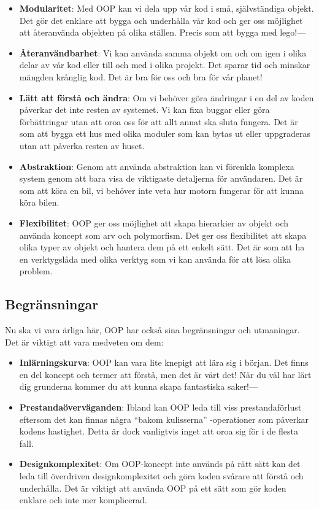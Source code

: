 \begin{itemize}
\tightlist
\item
  \textbf{Modularitet}: Med OOP kan vi dela upp vår kod i små,
  självständiga objekt. Det gör det enklare att bygga och underhålla vår
  kod och ger oss möjlighet att återanvända objekten på olika ställen.
  Precis som att bygga med lego!---
\item
  \textbf{Återanvändbarhet}: Vi kan använda samma objekt om och om igen
  i olika delar av vår kod eller till och med i olika projekt. Det
  sparar tid och minskar mängden krånglig kod. Det är bra för oss och
  bra för vår planet!
\item
  \textbf{Lätt att förstå och ändra}: Om vi behöver göra ändringar i en
  del av koden påverkar det inte resten av systemet. Vi kan fixa buggar
  eller göra förbättringar utan att oroa oss för att allt annat ska
  sluta fungera. Det är som att bygga ett hus med olika moduler som kan
  bytas ut eller uppgraderas utan att påverka resten av huset.
\item
  \textbf{Abstraktion}: Genom att använda abstraktion kan vi förenkla
  komplexa system genom att bara visa de viktigaste detaljerna för
  användaren. Det är som att köra en bil, vi behöver inte veta hur
  motorn fungerar för att kunna köra bilen.
\item
  \textbf{Flexibilitet}: OOP ger oss möjlighet att skapa hierarkier av
  objekt och använda koncept som arv och polymorfism. Det ger oss
  flexibilitet att skapa olika typer av objekt och hantera dem på ett
  enkelt sätt. Det är som att ha en verktygslåda med olika verktyg som
  vi kan använda för att lösa olika problem.
\end{itemize}

\hypertarget{begruxe4nsningar}{%
\subsection{Begränsningar}\label{begruxe4nsningar}}

Nu ska vi vara ärliga här, OOP har också sina begränsningar och
utmaningar. Det är viktigt att vara medveten om dem:

\begin{itemize}
\tightlist
\item
  \textbf{Inlärningskurva}: OOP kan vara lite knepigt att lära sig i
  början. Det finns en del koncept och termer att förstå, men det är
  värt det! När du väl har lärt dig grunderna kommer du att kunna skapa
  fantastiska saker!---
\item
  \textbf{Prestandaöverväganden}: Ibland kan OOP leda till viss
  prestandaförlust eftersom det kan finnas några ``bakom kulisserna''
  -operationer som påverkar kodens hastighet. Detta är dock vanligtvis
  inget att oroa sig för i de flesta fall.
\item
  \textbf{Designkomplexitet}: Om OOP-koncept inte används på rätt sätt
  kan det leda till överdriven designkomplexitet och göra koden svårare
  att förstå och underhålla. Det är viktigt att använda OOP på ett sätt
  som gör koden enklare och inte mer komplicerad.
\end{itemize}

